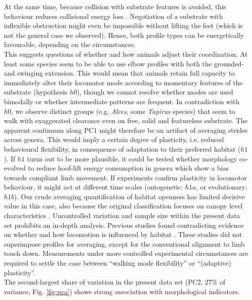 At the same time, because collision with substrate features is avoided, this behaviour reduces collisional energy loss \citep[i.e. loss from collision with superficial vegetation or rubble, which has to be distinguished from the collisional models in][]{Ruina2005}.
Negotiation of a substrate with inflexible obstruction might even be impossible without lifting the feet (which is not the general case we observed).
Hence, both profile types can be energetically favourable, depending on the circumstances.
\\This suggests questions of whether and how animals adjust their coordination.
At least some species seem to be able to use elbow profiles with both the grounded- and swinging extension.
This would mean that animals retain full capacity to immediately alter their locomotor mode according to momentary features of the substrate (hypothesis $h0$), though we cannot resolve whether modes are used bimodally or whether intermediate patterns are frequent.
In contradiction with $h0$, we observe distinct groups (e.g. \textit{Alces}, some \textit{Tapirus} species) that seem to walk with exaggerated clearance even on free, solid and featureless substrate.
The apparent continuum along PC1 might therefore be an artifact of averaging strides across genera.
This would imply a certain degree of plasticity, i.e. reduced behavioural flexibility, in consequence of adaptation to their preferred habitat ($h1$).
If $h1$ turns out to be more plausible, it could be tested whether morphology co-evolved to reduce hoof-lift energy consumption in genera which show a bias towards compliant limb movement.
If experiments confirm plasticity in locomotor behaviour, it might act at different time scales (ontogenetic: $h1a$, or evolutionary: $h1b$).
Our crude averaging quantification of habitat openness has limited decisive value in this case, also because the original classification focuses on canopy level characteristics \citep{Stankowich2009}.
Uncontrolled variation and sample size within the present data set prohibits an in-depth analysis.
Previous studies found contradicting evidence on whether and how locomotion is influenced by habitat \citep[][]{Stoessel2012,Fuller2011,Arnold1983,Schulte2004,Druelle2019}.
These studies did not superimpose profiles for averaging, except for the conventional alignment to limb touch down.
Measurements under more controlled experimental circumstances are required to settle the case between ``walking mode flexibility'' or ``(adaptive) plasticity''.
\smallskip\\The second-largest share of variation in the present data set (PC2, $27\%$ of variance, Fig. \ref{fig:pca}) shows strong association with morphological indicators.
